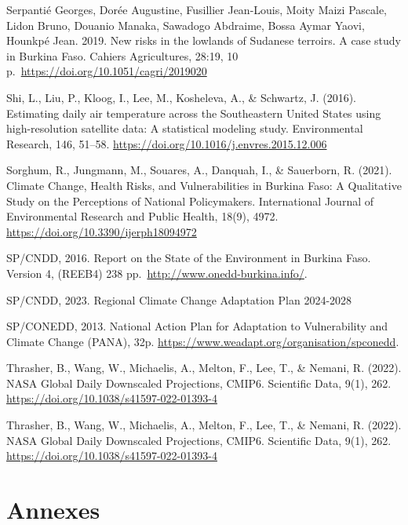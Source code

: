 \documentclass[
]{book}
\begin{document}
Serpantié Georges, Dorée Augustine, Fusillier Jean-Louis, Moity Maizi Pascale, Lidon Bruno, Douanio Manaka, Sawadogo Abdraime, Bossa Aymar Yaovi, Hounkpé Jean. 2019. New risks in the lowlands of Sudanese terroirs. A case study in Burkina Faso. Cahiers Agricultures, 28:19, 10 p.~\url{https://doi.org/10.1051/cagri/2019020}

Shi, L., Liu, P., Kloog, I., Lee, M., Kosheleva, A., \& Schwartz, J. (2016). Estimating daily air temperature across the Southeastern United States using high-resolution satellite data: A statistical modeling study. Environmental Research, 146, 51--58. \url{https://doi.org/10.1016/j.envres.2015.12.006}

Sorghum, R., Jungmann, M., Souares, A., Danquah, I., \& Sauerborn, R. (2021). Climate Change, Health Risks, and Vulnerabilities in Burkina Faso: A Qualitative Study on the Perceptions of National Policymakers. International Journal of Environmental Research and Public Health, 18(9), 4972. \url{https://doi.org/10.3390/ijerph18094972}

SP/CNDD, 2016. Report on the State of the Environment in Burkina Faso. Version 4, (REEB4) 238 pp.~\url{http://www.onedd-burkina.info/}.

SP/CNDD, 2023. Regional Climate Change Adaptation Plan 2024-2028

SP/CONEDD, 2013. National Action Plan for Adaptation to Vulnerability and Climate Change (PANA), 32p. \url{https://www.weadapt.org/organisation/spconedd}.

Thrasher, B., Wang, W., Michaelis, A., Melton, F., Lee, T., \& Nemani, R. (2022). NASA Global Daily Downscaled Projections, CMIP6. Scientific Data, 9(1), 262. \url{https://doi.org/10.1038/s41597-022-01393-4}

Thrasher, B., Wang, W., Michaelis, A., Melton, F., Lee, T., \& Nemani, R. (2022). NASA Global Daily Downscaled Projections, CMIP6. Scientific Data, 9(1), 262. \url{https://doi.org/10.1038/s41597-022-01393-4}

\chapter*{Annexes}\label{annexes}
\end{document}
